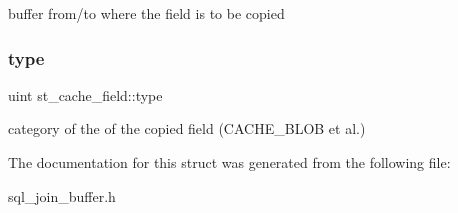 buffer from/to where the field is to be copied \mbox{\label{structst__cache__field_ae77e55995e7aa98b23bd4456b0c5abea}} 
\subsubsection{\texorpdfstring{type}{type}}
{\footnotesize\ttfamily uint st\+\_\+cache\+\_\+field\+::type}

category of the of the copied field (C\+A\+C\+H\+E\+\_\+\+B\+L\+OB et al.) 

The documentation for this struct was generated from the following file\+:\begin{DoxyCompactItemize}
\item 
sql\+\_\+join\+\_\+buffer.\+h\end{DoxyCompactItemize}
